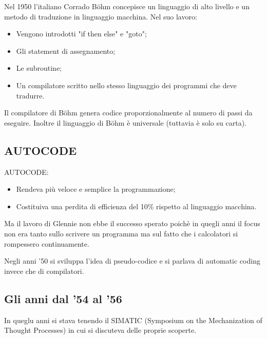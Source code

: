 Nel 1950 l'italiano Corrado Böhm concepisce un linguaggio di alto livello e un metodo di traduzione in 
linguaggio macchina. Nel suo lavoro:

\begin{itemize}
    \item Vengono introdotti "if then else" e "goto";
    \item Gli statement di assegnamento;
    \item Le subroutine;
    \item Un compilatore scritto nello stesso linguaggio dei programmi che deve tradurre.
\end{itemize}

Il compilatore di Böhm genera codice proporzionalmente al numero di passi da eseguire. Inoltre il linguaggio
di Böhm è universale (tuttavia è solo su carta).

\subsection{AUTOCODE}


AUTOCODE:

\begin{itemize}
    \item Rendeva più veloce e semplice la programmazione;
    \item Costituiva una perdita di efficienza del 10\% rispetto al linguaggio macchina.
\end{itemize}

Ma il lavoro di Glennie non ebbe il successo sperato poichè in quegli anni il focus non era tanto sullo scrivere un programma
ma sul fatto che i calcolatori si rompessero continuamente.

Negli anni '50 si sviluppa l'idea di pseudo-codice e si parlava di automatic coding invece che di compilatori.

\subsection{Gli anni dal '54 al '56}

In queglu anni si stava tenendo il SIMATIC (Symposium on the Mechanization of Thought Processes) in cui si discuteva
delle proprie scoperte.

